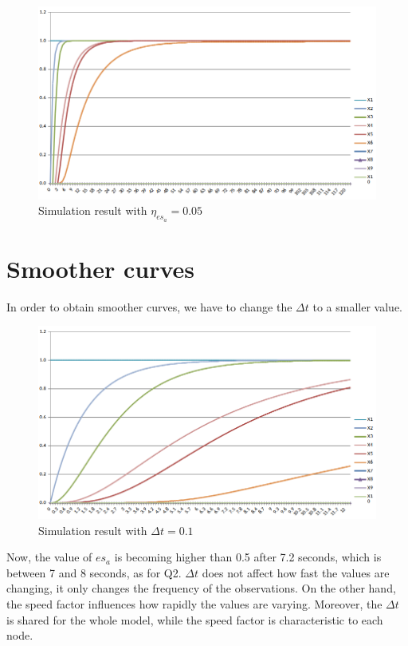 \documentclass[a4paper]{article}
\begin{document}
\begin{figure}[!htpb]
\center
\includegraphics[width=\textwidth]{res/img/results_speed_factor}
\caption{Simulation result with $\eta_{es_{a}} = 0.05$}
\label{fig:simulation_result_speed_factor}
\end{figure}

\section{Smoother curves}

In order to obtain smoother curves, we have to change the $\Delta t$ to a smaller value.

\begin{figure}[!htpb]
\center
\includegraphics[width=\textwidth]{res/img/results_delta_t}
\caption{Simulation result with $\Delta t = 0.1$}
\label{fig:simulation_result_delta_t}
\end{figure}

Now, the value of $es_{a}$ is becoming higher than 0.5 after 7.2 seconds, which is between 7 and 8 seconds, as for Q2.
$\Delta t$ does not affect how fast the values are changing, it only changes the frequency of the observations. On the other hand, the speed factor influences how rapidly the values are varying. Moreover, the $\Delta t$ is shared for the whole model, while the speed factor is characteristic to each node.
\end{document}
